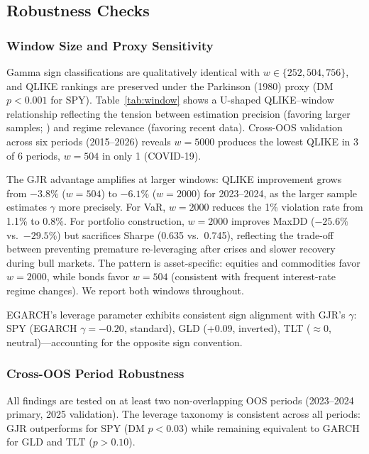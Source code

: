 \subsection{Robustness Checks}
\label{sec:robustness_checks}

\subsubsection{Window Size and Proxy Sensitivity}

Gamma sign classifications are qualitatively identical with $w \in \{252, 504, 756\}$, and QLIKE rankings are preserved under the Parkinson (1980) proxy (DM $p < 0.001$ for SPY). Table~\ref{tab:window} shows a U-shaped QLIKE--window relationship reflecting the tension between estimation precision (favoring larger samples; \citealt{hwang2006}) and regime relevance (favoring recent data). Cross-OOS validation across six periods (2015--2026) reveals $w = 5000$ produces the lowest QLIKE in 3 of 6 periods, $w = 504$ in only 1 (COVID-19).

The GJR advantage amplifies at larger windows: QLIKE improvement grows from $-3.8\%$ ($w = 504$) to $-6.1\%$ ($w = 2000$) for 2023--2024, as the larger sample estimates $\gamma$ more precisely. For VaR, $w = 2000$ reduces the 1\% violation rate from 1.1\% to 0.8\%. For portfolio construction, $w = 2000$ improves MaxDD ($-25.6\%$ vs.\ $-29.5\%$) but sacrifices Sharpe (0.635 vs.\ 0.745), reflecting the trade-off between preventing premature re-leveraging after crises and slower recovery during bull markets. The pattern is asset-specific: equities and commodities favor $w = 2000$, while bonds favor $w = 504$ (consistent with frequent interest-rate regime changes). We report both windows throughout.

EGARCH's leverage parameter exhibits consistent sign alignment with GJR's $\gamma$: SPY (EGARCH $\gamma = -0.20$, standard), GLD (+0.09, inverted), TLT ($\approx 0$, neutral)---accounting for the opposite sign convention.

\subsubsection{Cross-OOS Period Robustness}

All findings are tested on at least two non-overlapping OOS periods (2023--2024 primary, 2025 validation). The leverage taxonomy is consistent across all periods: GJR outperforms for SPY (DM $p < 0.03$) while remaining equivalent to GARCH for GLD and TLT ($p > 0.10$).


